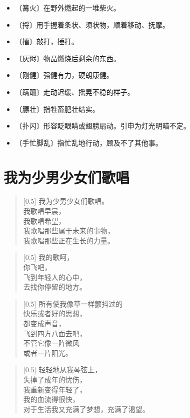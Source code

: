 \documentclass[12pt,UTF-8,openany]{ctexbook}
\begin{document}
\begin{itemize}
    \setlength\itemsep{-0.2em}
    \item 〔篝火〕在野外燃起的一堆柴火。
    \item 〔捋〕用手握着条状、须状物，顺着移动、抚摩。
    \item 〔擂〕敲打，捶打。
    \item 〔灰烬〕物品燃烧后剩余的东西。
    \item 〔刚健〕强健有力，硬朗康健。
    \item 〔蹒跚〕走动迟缓、摇晃不稳的样子。
    \item 〔膘壮〕指牲畜肥壮结实。
    \item 〔扑闪〕形容眨眼睛或翅膀扇动。引申为灯光明暗不定。
    \item 〔手忙脚乱〕指忙乱地行动，顾及不了其他事。
\end{itemize}

\chapter{我为少男少女们歌唱}

\begin{Large}
    
    \begin{verse}[0.5\linewidth]
        我为少男少女们歌唱。 \\
        我歌唱早晨， \\
        我歌唱希望， \\
        我歌唱那些属于未来的事物， \\
        我歌唱那些正在生长的力量。
    \end{verse}
    
    
    \begin{verse}[0.5\linewidth]
        我的歌呵， \\
        你飞吧， \\
        飞到年轻人的心中， \\
        去找你停留的地方。
    \end{verse}
    
    
    \begin{verse}[0.5\linewidth]
        所有使我像草一样颤抖过的 \\
        快乐或者好的思想， \\
        都变成声音， \\
        飞到四方八面去吧， \\
        不管它像一阵微风 \\
        或者一片阳光。
    \end{verse}
    
    
    \begin{verse}[0.5\linewidth]
        轻轻地从我琴弦上， \\
        失掉了成年的忧伤， \\
        我重新变得年轻了， \\
        我的血流得很快， \\
        对于生活我又充满了梦想，充满了渴望。
    \end{verse}
    
\end{Large}
\end{document}
